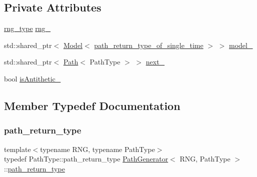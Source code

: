 \subsection*{Private Attributes}
\begin{DoxyCompactItemize}
\item 
\hyperlink{class_path_generator_a7e71cbb5376b07b319b1f042a1035335}{rng\+\_\+type} \hyperlink{class_path_generator_a9a6ba7393db535890497b21b46bdfe67}{rng\+\_\+}
\item 
std\+::shared\+\_\+ptr$<$ \hyperlink{class_model}{Model}$<$ \hyperlink{class_path_generator_a467bc3ddaa5e9104170550617e767349}{path\+\_\+return\+\_\+type\+\_\+of\+\_\+single\+\_\+time} $>$ $>$ \hyperlink{class_path_generator_a92eef9405a03784534b561f56080ed8b}{model\+\_\+}
\item 
std\+::shared\+\_\+ptr$<$ \hyperlink{class_path}{Path}$<$ Path\+Type $>$ $>$ \hyperlink{class_path_generator_a2a085e303b74fbc34f12161eed56c331}{next\+\_\+}
\item 
bool \hyperlink{class_path_generator_a936af20e588195ca95d02cc302ea5d8b}{is\+Antithetic\+\_\+}
\end{DoxyCompactItemize}


\subsection{Member Typedef Documentation}
\hypertarget{class_path_generator_a7c8e36c418bdb1d8e99c44ac75a5e02a}{}\label{class_path_generator_a7c8e36c418bdb1d8e99c44ac75a5e02a} 
\subsubsection{\texorpdfstring{path\+\_\+return\+\_\+type}{path\_return\_type}}
{\footnotesize\ttfamily template$<$typename R\+NG, typename Path\+Type$>$ \\
typedef Path\+Type\+::path\+\_\+return\+\_\+type \hyperlink{class_path_generator}{Path\+Generator}$<$ R\+NG, Path\+Type $>$\+::\hyperlink{class_path_generator_a7c8e36c418bdb1d8e99c44ac75a5e02a}{path\+\_\+return\+\_\+type}}

\hypertarget{class_path_generator_a467bc3ddaa5e9104170550617e767349}{}\label{class_path_generator_a467bc3ddaa5e9104170550617e767349} 
